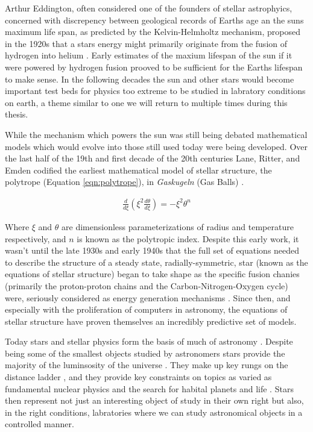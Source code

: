 Arthur Eddington, often considered one of the founders of stellar astrophyics,
concerned with discrepency between geological records of Earths age an the suns maximum life
span, as predicted by the Kelvin-Helmholtz mechanism, proposed in the 1920s
that a stars energy might primarily originate from the fusion of hydrogen into
helium \addcite. Early estimates of the maxium lifespan of the sun if it were
powered by hydrogen fusion prooved to be sufficient for the Earths lifespan to
make sense. In the following decades the sun and other stars would become
important test beds for physics too extreme to be studied in labratory conditions
on earth, a theme similar to one we will return to multiple times during
this thesis.

While the mechanism which powers the sun was still being debated mathematical
models which would evolve into those still used today were being developed.
Over the last half of the 19th and first decade of the 20th centuries Lane,
Ritter, and Emden codified the earliest mathematical model of stellar
structure, the polytrope (Equation \ref{eqn:polytrope}), in \textit{Gaskugeln}
(Gas Balls) \citep{Emden1907}.

\begin{align}\label{eqn:polytrope}
	\frac{d}{d\xi}\left(\xi^{2}\frac{d\theta}{d\xi}\right) = -\xi^{2}\theta^{n}
\end{align}

Where $\xi$ and $\theta$ are dimensionless parameterizations of radius and
temperature respectively, and $n$ is known as the polytropic index. Despite
this early work, it wasn't until the late 1930s and early 1940s that the full
set of equations needed to describe the structure of a steady state,
radially-symmetric, star (known as the equations of stellar structure) began to
take shape as the specific fusion chanies (primarily the proton-proton chains
and the Carbon-Nitrogen-Oxygen cycle) were, seriously considered as energy
generation mechanisms \citep{Cowling1966}. Since then, and especially with the
proliferation of computers in astronomy, the equations of stellar structure
have proven themselves an incredibly predictive set of models.  

Today stars and stellar physics form the basis of much of astronomy \addcite.
Despite being some of the smallest objects studied by astronomers stars provide
the majority of the luminsosity of the universe \addcite. They make up key
rungs on the distance ladder \addcite, and they provide key constraints on
topics as varied as fundamental nuclear physics \addcite and the search for
habital planets and life \addcite. Stars then represent not just an interesting
object of study in their own right but also, in the right conditions, labratories
where we can study astronomical objects in a controlled manner.

